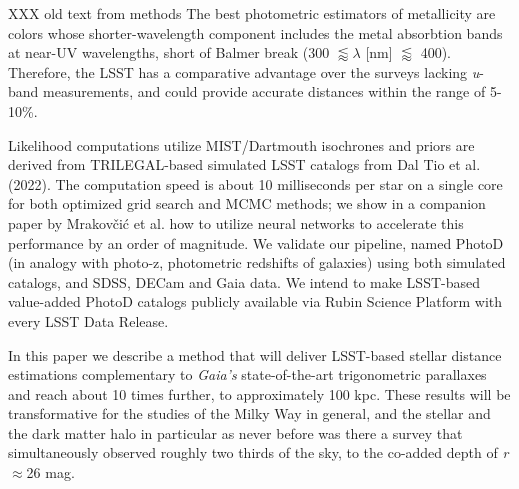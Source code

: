 






XXX  old text from methods 
The best photometric estimators of metallicity are colors whose shorter-wavelength component includes the metal absorbtion bands at near-UV wavelengths, short of Balmer break (300 $\lessapprox\lambda$ [nm] $\lessapprox$ 400). Therefore, the LSST has a comparative advantage over the surveys lacking \textit{u}-band measurements, and could provide accurate distances within the range of 5-10\%. 


Likelihood computations utilize MIST/Dartmouth isochrones
and priors are derived from TRILEGAL-based simulated LSST catalogs from Dal Tio et al. (2022). The computation speed is about 10 milliseconds per
star on a single core for both optimized grid search and MCMC methods; we show in a companion paper by Mrakov\v{c}i\'{c} et al. how to utilize neural
networks to accelerate this performance by an order of magnitude.  We validate our pipeline, named
PhotoD (in analogy with photo-z, photometric redshifts of galaxies) using both simulated catalogs, and SDSS, DECam and Gaia data. 
We intend to make LSST-based value-added PhotoD catalogs publicly
available via Rubin Science Platform with every LSST Data Release.


In this paper we describe a method that will deliver LSST-based stellar distance estimations complementary to \textit{Gaia's} state-of-the-art trigonometric parallaxes and reach about 10 times further, to approximately 100 kpc. These results will be transformative for the studies of the Milky Way in general, and the stellar and the dark matter halo in particular as never before was there a survey that simultaneously observed roughly two thirds of the sky, to the co-added depth of \textit{r}$\approx$26 mag. 


